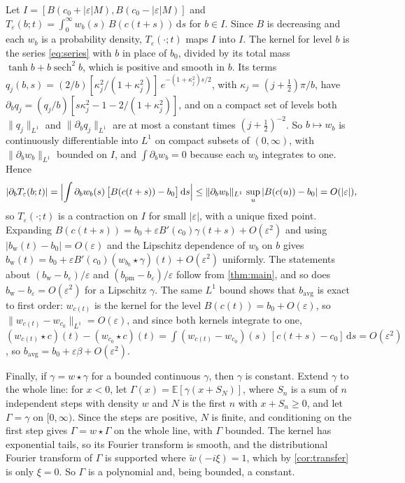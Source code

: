 \documentclass[11pt]{article}
\theoremstyle{definition}
\theoremstyle{remark}
\newcommand{\E}{\mathbb{E}}
\newcommand{\dd}{\,\mathrm{d}}
\newcommand{\sech}{\operatorname{sech}}
\begin{document}
Let $I = [B(c_0 + |\varepsilon|M), B(c_0 - |\varepsilon|M)]$ and
$T_\varepsilon(b; t) = \int_0^\infty w_b(s)\,B(c(t+s))\dd s$ for $b \in I$. Since $B$ is
decreasing and each $w_b$ is a probability density, $T_\varepsilon(\cdot; t)$ maps $I$ into $I$.
The kernel for level $b$ is the series \eqref{eq:series} with $b$ in place of $b_0$, divided
by its total mass $\tanh b + b\sech^2 b$, which is positive and smooth in $b$. Its terms
$q_j(b, s) = (2/b)[\kappa_j^2/(1 + \kappa_j^2)]\,e^{-(1 + \kappa_j^2)s/2}$, with
$\kappa_j = (j + \tfrac12)\pi/b$, have
$\partial_b q_j = (q_j/b)[s\kappa_j^2 - 1 - 2/(1 + \kappa_j^2)]$, and on a compact set of levels
both $\|q_j\|_{L^1}$ and $\|\partial_b q_j\|_{L^1}$ are at most a constant times $(j + \tfrac12)^{-2}$.
So $b \mapsto w_b$ is continuously differentiable into $L^1$ on compact subsets of $(0, \infty)$,
with $\|\partial_b w_b\|_{L^1}$ bounded on $I$, and $\int\partial_b w_b = 0$ because each $w_b$
integrates to one. Hence
\begin{equation}
  |\partial_b T_\varepsilon(b; t)| = \Bigl|\int \partial_b w_b(s)\,\bigl[B(c(t+s)) - b_0\bigr]\dd s\Bigr|
  \le \|\partial_b w_b\|_{L^1}\,\sup_u |B(c(u)) - b_0| = O(|\varepsilon|),
\end{equation}
so $T_\varepsilon(\cdot; t)$ is a contraction on $I$ for small $|\varepsilon|$, with a unique fixed
point. Expanding $B(c(t+s)) = b_0 + \varepsilon B'(c_0)\gamma(t+s) + O(\varepsilon^2)$ and using
$|b_{\mathrm{w}}(t) - b_0| = O(\varepsilon)$ and the Lipschitz dependence of $w_b$ on $b$ gives
$b_{\mathrm{w}}(t) = b_0 + \varepsilon B'(c_0)(w_{b_0} \star \gamma)(t) + O(\varepsilon^2)$ uniformly.
The statements about $(b_{\mathrm{w}} - b_\varepsilon)/\varepsilon$ and
$(b_{\mathrm{pm}} - b_\varepsilon)/\varepsilon$ follow from \cref{thm:main}, and so does
$b_{\mathrm{w}} - b_\varepsilon = O(\varepsilon^2)$ for a Lipschitz $\gamma$. The same $L^1$ bound
shows that $b_{\mathrm{avg}}$ is exact to first order: $w_{c(t)}$ is the kernel for the level
$B(c(t)) = b_0 + O(\varepsilon)$, so $\|w_{c(t)} - w_{c_0}\|_{L^1} = O(\varepsilon)$, and since both
kernels integrate to one, $(w_{c(t)} \star c)(t) - (w_{c_0} \star c)(t) =
\int (w_{c(t)} - w_{c_0})(s)\,[c(t+s) - c_0]\dd s = O(\varepsilon^2)$, so
$b_{\mathrm{avg}} = b_0 + \varepsilon\beta + O(\varepsilon^2)$.

Finally, if $\gamma = w \star \gamma$ for a bounded continuous $\gamma$, then $\gamma$ is constant.
Extend $\gamma$ to the whole line: for $x < 0$, let $\Gamma(x) = \E[\gamma(x + S_N)]$, where $S_n$
is a sum of $n$ independent steps with density $w$ and $N$ is the first $n$ with $x + S_n \ge 0$,
and let $\Gamma = \gamma$ on $[0, \infty)$. Since the steps are positive, $N$ is finite, and
conditioning on the first step gives $\Gamma = w \star \Gamma$ on the whole line, with $\Gamma$
bounded. The kernel has exponential tails, so its Fourier transform is smooth, and the
distributional Fourier transform of $\Gamma$ is supported where $\tilde w(-i\xi) = 1$, which by
\cref{cor:transfer} is only $\xi = 0$. So $\Gamma$ is a polynomial and, being bounded, a
constant.
\end{document}
